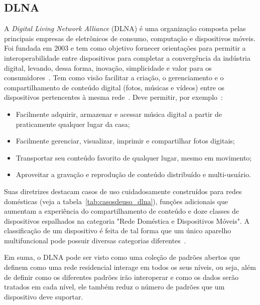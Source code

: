 \subsection{DLNA}

A \emph{Digital Living Network Alliance} (DLNA) é uma organização composta pelas principais empresas de eletrônicos de consumo, computação e dispositivos móveis. Foi fundada em 2003 e tem como objetivo fornecer orientações para permitir a interoperabilidade entre dispositivos para completar a convergência da indústria digital, levando, dessa forma, inovação, simplicidade e valor para os consumidores~\cite{dlnaoverview}. Tem como visão facilitar a criação, o gerenciamento e o compartilhamento de conteúdo digital (fotos, músicas e vídeos) entre os dispositivos pertencentes à mesma rede~\cite{dlnahdvideostreaming}. Deve permitir, por exemplo~\cite{dlnaoverview}:

\begin{itemize}
	\item Facilmente adquirir, armazenar e acessar música digital a partir de praticamente qualquer lugar da casa;
	\item Facilmente gerenciar, visualizar, imprimir e compartilhar fotos digitais;
	\item Transportar seu conteúdo favorito de qualquer lugar, mesmo em movimento;
	\item Aproveitar a gravação e reprodução de conteúdo distribuído e multi-usuário.
\end{itemize}

Suas diretrizes destacam casos de uso cuidadosamente construídos para redes domésticas (veja a tabela~\ref{tab:casosdeuso_dlna}), funções adicionais que aumentam a experiência do compartilhamento de conteúdo e doze classes de dispositivos espalhados na categoria "Rede Doméstica e Dispositivos Móveis". A classificação de um dispositivo é feita de tal forma que um único aparelho multifuncional pode possuir diversas categorias diferentes~\cite{dlnahdvideostreaming}.

Em suma, o DLNA pode ser visto como uma coleção de padrões abertos que definem como uma rede residencial interage em todos os seus níveis, ou seja, além de definir como os diferentes padrões irão interoperar e como os dados serão tratados em cada nível, ele também reduz o número de padrões que um dispositivo deve suportar.

